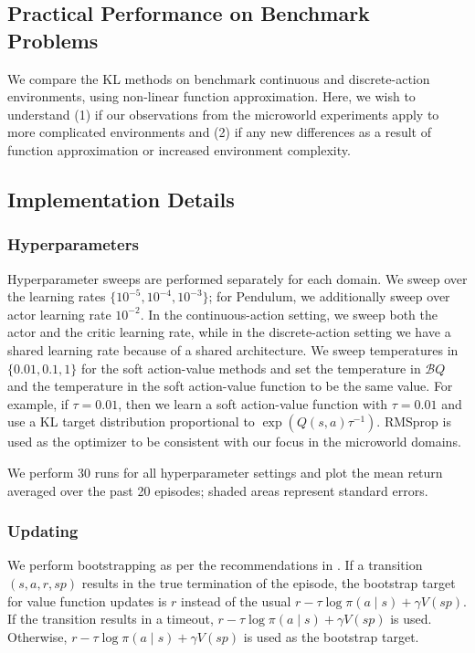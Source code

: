 \documentclass[twoside,11pt]{article}
\newcommand{\boltzmannQ}{\mathcal{B}Q}
\begin{document}
\subsection{Practical Performance on Benchmark Problems}

We compare the KL methods on benchmark continuous and discrete-action environments, using non-linear function approximation. Here, we wish to understand (1) if our observations from the microworld experiments apply to more complicated environments and (2) if any new differences as a result of function approximation or increased environment complexity. 

\subsection{Implementation Details}
\subsubsection{Hyperparameters}
Hyperparameter sweeps are performed separately for each domain. We sweep over the learning rates $\{10^{-5}, 10^{-4}, 10^{-3}\}$; for Pendulum, we additionally sweep over actor learning rate $10^{-2}$. In the continuous-action setting, we sweep both the actor and the critic learning rate, while in the discrete-action setting we have a shared learning rate because of a shared architecture. We sweep temperatures in $\{0.01, 0.1, 1\}$ for the soft action-value methods and set the temperature in $\boltzmannQ$ and the temperature in the soft action-value function to be the same value. For example, if $\tau = 0.01$, then we learn a soft action-value function with $\tau = 0.01$ and use a KL target distribution proportional to $\exp(Q(s, a) \tau^{-1})$. RMSprop \citep{tieleman2012lecture} is used as the optimizer to be consistent with our focus in the microworld domains. 

We perform 30 runs for all hyperparameter settings and plot the mean return averaged over the past 20 episodes; shaded areas represent standard errors. 


\subsubsection{Updating}
We perform bootstrapping as per the recommendations in \citet{pardo2017time}. If a transition $(s, a, r, sp)$ results in the true termination of the episode, the bootstrap target for value function updates is $r$ instead of the usual $r - \tau \log \pi(a \mid s) + \gamma V(sp)$. If the transition results in a timeout, $r - \tau \log \pi(a \mid s) + \gamma V(sp)$ is used. Otherwise, $r - \tau \log \pi(a \mid s) + \gamma V(sp)$ is used as the bootstrap target. 
\end{document}
